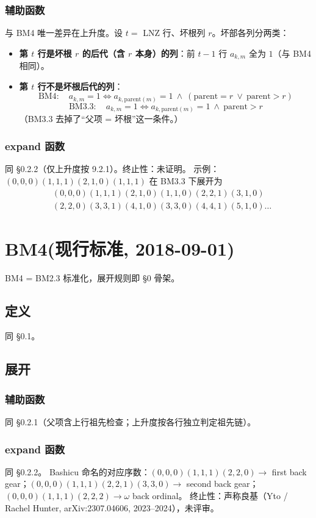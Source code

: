 \documentclass[UTF8]{ctexart}
\begin{document}
\subsubsection{辅助函数}
与 BM4 唯一差异在上升度。设 $t=$ LNZ 行、坏根列 $r$。坏部各列分两类：
\begin{itemize}
  \item \textbf{第 $t$ 行是坏根 $r$ 的后代（含 $r$ 本身）的列}：前 $t-1$ 行 $a_{k,m}$ 全为 $1$（与 BM4 相同）。
  \item \textbf{第 $t$ 行不是坏根后代的列}：
  \[
  \text{BM4}:\quad a_{k,m}=1\iff a_{k,\mathrm{parent}(m)}=1\ \land\ (\mathrm{parent}=r\ \lor\ \mathrm{parent}>r)
  \]
  \[
  \text{BM3.3}:\quad a_{k,m}=1\iff a_{k,\mathrm{parent}(m)}=1\ \land\ \mathrm{parent}>r
  \]
  （BM3.3 去掉了“父项 = 坏根”这一条件。）
\end{itemize}

\subsubsection{expand 函数}
同 \S 0.2.2（仅上升度按 9.2.1）。终止性：未证明。
示例：$(0,0,0)\allowbreak(1,1,1)\allowbreak(2,1,0)\allowbreak(1,1,1)$ 在 BM3.3 下展开为
\[
\begin{aligned}
&(0,0,0)(1,1,1)(2,1,0)(1,1,0)(2,2,1)(3,1,0)\\
&(2,2,0)(3,3,1)(4,1,0)(3,3,0)(4,4,1)(5,1,0)\dots
\end{aligned}
\]

\section{BM4(现行标准, 2018-09-01)}
BM4 = BM2.3 标准化，展开规则即 \S 0 骨架。
\subsection{定义}
同 \S 0.1。

\subsection{展开}
\subsubsection{辅助函数}
同 \S 0.2.1（父项含上行祖先检查；上升度按各行独立判定祖先链）。

\subsubsection{expand 函数}
同 \S 0.2.2。
Bashicu 命名的对应序数：$(0,0,0)\allowbreak(1,1,1)\allowbreak(2,2,0)\to$ first back gear；$(0,0,0)\allowbreak(1,1,1)\allowbreak(2,2,1)\allowbreak(3,3,0)\to$ second back gear；$(0,0,0)\allowbreak(1,1,1)\allowbreak(2,2,2)\to\omega$ back ordinal。
终止性：声称良基（Yto / Rachel Hunter, arXiv:2307.04606, 2023--2024），未评审。
\end{document}
